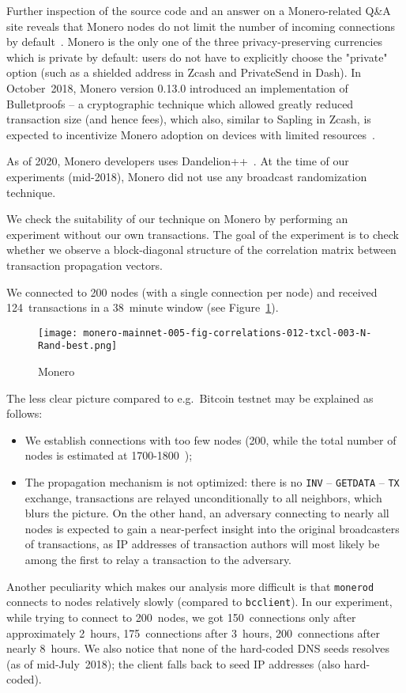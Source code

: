 Further inspection of the source code and an answer on a Monero-related Q\&A site reveals that Monero nodes do not limit the number of incoming connections by default~\cite{user363032016}.
Monero is the only one of the three privacy-preserving currencies which is private by default: users do not have to explicitly choose the "private" option (such as a shielded address in Zcash and PrivateSend in Dash).
In October~2018, Monero version 0.13.0 introduced an implementation of Bulletproofs -- a cryptographic technique which allowed greatly reduced transaction size (and hence fees), which also, similar to Sapling in Zcash, is expected to incentivize Monero adoption on devices with limited resources~\cite{Spagni2018}.

As of 2020, Monero developers uses Dandelion++~\cite{ErCiccione2020}.
At the time of our experiments (mid-2018), Monero did not use any broadcast randomization technique.

We check the suitability of our technique on Monero by performing an experiment without our own transactions.
The goal of the experiment is to check whether we observe a block-diagonal structure of the correlation matrix between transaction propagation vectors.

We connected to 200 nodes (with a single connection per node) and received 124~transactions in a 38~minute window (see Figure~\ref{fig:monero}).

\begin{figure}[!t]
	\texttt{[image: monero-mainnet-005-fig-correlations-012-txcl-003-N-Rand-best.png]}
	\caption{Monero}
	\label{fig:monero}
\end{figure}

The less clear picture compared to e.g.~Bitcoin testnet may be explained as follows:
\begin{itemize}
	\item We establish connections with too few nodes (200, while the total number of nodes is estimated at 1700-1800~\cite{MoneroHash});
	\item The propagation mechanism is not optimized: there is no \texttt{INV} -- \texttt{GETDATA} -- \texttt{TX} exchange, transactions are relayed unconditionally to all neighbors, which blurs the picture. On the other hand, an adversary connecting to nearly all nodes is expected to gain a near-perfect insight into the original broadcasters of transactions, as IP addresses of transaction authors will most likely be among the first to relay a transaction to the adversary.
\end{itemize}
Another peculiarity which makes our analysis more difficult is that \texttt{monerod} connects to nodes relatively slowly (compared to \texttt{bcclient}).
In our experiment, while trying to connect to 200~nodes, we got 150~connections only after approximately 2~hours, 175~connections after 3~hours, 200~connections after nearly 8~hours.
We also notice that none of the hard-coded DNS seeds resolves (as of mid-July~2018); the client falls back to seed IP addresses (also hard-coded).



